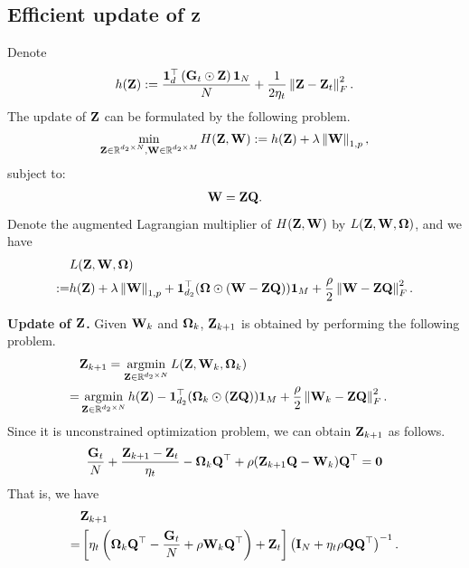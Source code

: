 \documentclass[journal]{IEEEtran}
\begin{document}
\subsection{Efficient update of ${\bf Z}$} 

Denote 
\begin{align}
\nonumber
h({\bf Z}) :=  \frac{{\bf 1}_d^\top\left( {\bf G}_t \odot {\bf Z} \right){\bf 1}_N}{N} + \frac{1}{2\eta_t}\left\lVert{\bf Z} - {\bf Z}_t\right\rVert_F^2.
\end{align} The update of ${\bf Z}$ can be formulated by the following problem.
\begin{align}
\nonumber
\min_{\substack{{\bf Z}\in\mathbb{R}^{d_2\times N}, {\bf W}\in\mathbb{R}^{d_2\times M}}} H({\bf Z}, {\bf W}) := h({\bf Z}) + \lambda \left\lVert{\bf W}\right\rVert_{1,p},
\end{align} subject to:
\begin{align}
\nonumber
{\bf W} = {\bf Z}{\bf Q}.
\end{align} Denote the augmented Lagrangian multiplier of $H({\bf Z}, {\bf W})$ by $L({\bf Z}, {\bf W}, \boldsymbol{\Omega})$, and we have 
\begin{align}
\nonumber
& L({\bf Z}, {\bf W}, \boldsymbol{\Omega}) \\ \nonumber
:= & h({\bf Z}) + \lambda \left\lVert{\bf W}\right\rVert_{1,p} + {\bf 1}_{d_2}^\top(\boldsymbol{\Omega} \odot ({\bf W} - {\bf Z}{\bf Q})){\bf 1}_M + \frac{\rho}{2}\left\lVert{\bf W} - {\bf Z}{\bf Q}\right\rVert_F^2.
\end{align} 

\textbf{Update of ${\bf Z}$.} Given ${\bf W}_k$ and $\boldsymbol{\Omega}_k$, ${\bf Z}_{k+1}$ is obtained by performing the following problem.
\begin{align}
\nonumber
& \Z_{k+1}  = \argmin_{\Z\in\RR^{d_2\times N}} L(\Z, \W_k, \bOmega_k) & \\ \nonumber
= & \argmin_{\Z\in\RR^{d_2\times N}} h(\Z) - \1_{d_2}^\top(\bOmega_k \odot  (\Z\Q))\1_M + \frac{\rho}{2}\lrnorm{\W_k - \Z\Q}_F^2.
\end{align} Since it is unconstrained optimization problem, we can obtain ${\bf Z}_{k+1}$ as follows.
\begin{align}
\nonumber
\frac{{\bf G}_t}{N} + \frac{{\bf Z}_{k+1} - {\bf Z}_t}{\eta_t} -\boldsymbol{\Omega}_k{\bf Q}^\top + \rho ({\bf Z}_{k+1}{\bf Q} - {\bf W}_k){\bf Q}^\top = {\bf 0}
\end{align} That is, we have 
\begin{align}
\nonumber
& {\bf Z}_{k+1} \\ \nonumber
= & \left [ \eta_t\left( \boldsymbol{\Omega}_k{\bf Q}^\top-\frac{{\bf G}_t}{N}+\rho{\bf W}_k{\bf Q}^\top \right)+{\bf Z}_t \right ]\left( {\bf I}_N+\eta_t\rho{\bf Q}{\bf Q}^\top \right)^{-1}.
\end{align}
\end{document}
